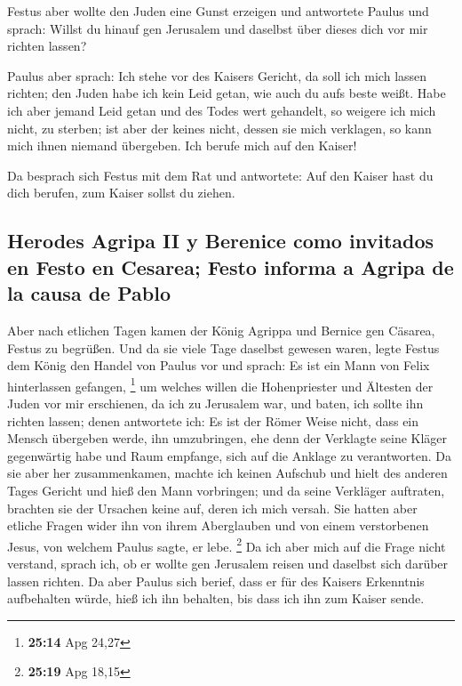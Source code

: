  Festus aber wollte den Juden eine Gunst erzeigen und
antwortete Paulus und sprach: Willst du hinauf gen Jerusalem und
daselbst über dieses dich vor mir richten lassen?

 Paulus aber sprach: Ich stehe vor des Kaisers Gericht,
da soll ich mich lassen richten; den Juden habe ich kein Leid getan, wie
auch du aufs beste weißt.  Habe ich aber jemand Leid
getan und des Todes wert gehandelt, so weigere ich mich nicht, zu
sterben; ist aber der keines nicht, dessen sie mich verklagen, so kann
mich ihnen niemand übergeben. Ich berufe mich auf den Kaiser!

 Da besprach sich Festus mit dem Rat und antwortete: Auf
den Kaiser hast du dich berufen, zum Kaiser sollst du ziehen.

\hypertarget{herodes-agripa-ii-y-berenice-como-invitados-en-festo-en-cesarea-festo-informa-a-agripa-de-la-causa-de-pablo}{%
\subsection{Herodes Agripa II y Berenice como invitados en Festo en
Cesarea; Festo informa a Agripa de la causa de
Pablo}\label{herodes-agripa-ii-y-berenice-como-invitados-en-festo-en-cesarea-festo-informa-a-agripa-de-la-causa-de-pablo}}

 Aber nach etlichen Tagen kamen der König Agrippa und
Bernice gen Cäsarea, Festus zu begrüßen.  Und da sie
viele Tage daselbst gewesen waren, legte Festus dem König den Handel von
Paulus vor und sprach: Es ist ein Mann von Felix hinterlassen gefangen,
\footnote{\textbf{25:14} Apg 24,27}  um welches willen
die Hohenpriester und Ältesten der Juden vor mir erschienen, da ich zu
Jerusalem war, und baten, ich sollte ihn richten lassen; 
denen antwortete ich: Es ist der Römer Weise nicht, dass ein Mensch
übergeben werde, ihn umzubringen, ehe denn der Verklagte seine Kläger
gegenwärtig habe und Raum empfange, sich auf die Anklage zu
verantworten.  Da sie aber her zusammenkamen, machte ich
keinen Aufschub und hielt des anderen Tages Gericht und hieß den Mann
vorbringen;  und da seine Verkläger auftraten, brachten
sie der Ursachen keine auf, deren ich mich versah.  Sie
hatten aber etliche Fragen wider ihn von ihrem Aberglauben und von einem
verstorbenen Jesus, von welchem Paulus sagte, er lebe. \footnote{\textbf{25:19}
  Apg 18,15}  Da ich aber mich auf die Frage nicht
verstand, sprach ich, ob er wollte gen Jerusalem reisen und daselbst
sich darüber lassen richten.  Da aber Paulus sich berief,
dass er für des Kaisers Erkenntnis aufbehalten würde, hieß ich ihn
behalten, bis dass ich ihn zum Kaiser sende.


